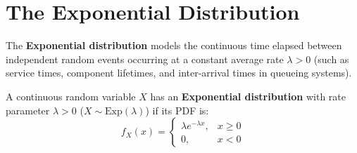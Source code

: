 \documentclass[12pt,a4paper]{article}
\begin{document}
\section{The Exponential Distribution}

The \textbf{Exponential distribution} models the continuous time elapsed between independent random events occurring at a constant average rate $\lambda > 0$ (such as service times, component lifetimes, and inter-arrival times in queueing systems).

\begin{tcolorbox}[defbox, title={\textbf{Definition: Exponential Distribution $\operatorname{Exp}(\lambda)$}}]
A continuous random variable $X$ has an \textbf{Exponential distribution} with rate parameter $\lambda > 0$ ($X \sim \text{Exp}(\lambda)$) if its PDF is:
\begin{equation}
  f_X(x) =
  \begin{cases}
    \lambda e^{-\lambda x}, & x \ge 0 \\[3pt]
    0, & x < 0
  \end{cases}
\end{equation}
\end{tcolorbox}
\end{document}
